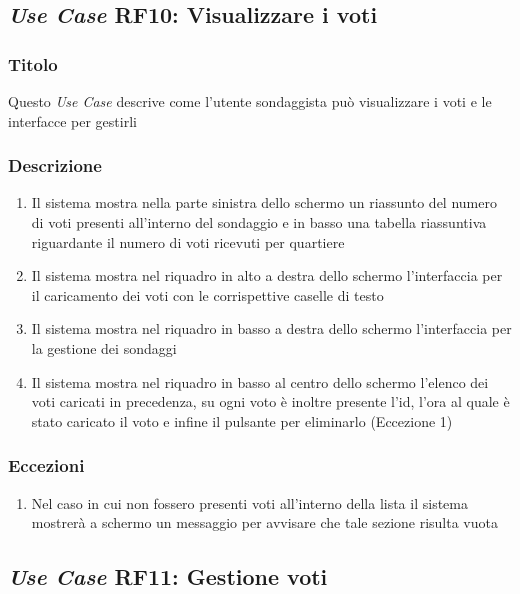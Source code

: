     \subsection{\textit{Use Case} RF10: Visualizzare i voti}
        \subsubsection{Titolo}
            Questo \textit{Use Case} descrive come l'utente sondaggista può visualizzare i voti e le interfacce per gestirli
        \subsubsection{Descrizione}
            \begin{enumerate}
                \item Il sistema mostra nella parte sinistra dello schermo un riassunto del numero di voti presenti all'interno del sondaggio e in basso una tabella riassuntiva riguardante il numero di voti ricevuti per quartiere
                \item Il sistema mostra nel riquadro in alto a destra dello schermo l'interfaccia per il caricamento dei voti con le corrispettive caselle di testo
                \item Il sistema mostra nel riquadro in basso a destra dello schermo l'interfaccia per la gestione dei sondaggi
                \item Il sistema mostra nel riquadro in basso al centro dello schermo l'elenco dei voti caricati in precedenza, su ogni voto è inoltre presente l'id, l'ora al quale è stato caricato il voto e infine il pulsante per eliminarlo (Eccezione 1)
            \end{enumerate}
        \subsubsection{Eccezioni}
            \begin{enumerate}
                \item Nel caso in cui non fossero presenti voti all'interno della lista il sistema mostrerà a schermo un messaggio per avvisare che tale sezione risulta vuota
            \end{enumerate}

    \subsection{\textit{Use Case} RF11: Gestione voti}
